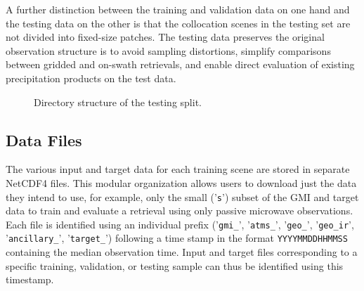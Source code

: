 \documentclass[11pt]{article}
\begin{document}
A further distinction between the training and validation data on one hand and
the testing data on the other is that the collocation scenes in the testing set
are not divided into fixed-size patches. The testing data preserves the original
observation structure is to avoid sampling distortions, simplify comparisons
between gridded and on-swath retrievals, and enable direct evaluation of
existing precipitation products on the test data.


\begin{figure}[hbpt!] %


	\caption{
		Directory structure of the testing split.
	}
	\label{fig:testing_organization}
\end{figure}

\subsection{Data Files}

The various input and target data for each training scene are stored in separate
NetCDF4 files. This modular organization allows users to download just the data
they intend to use, for example, only the small ('\texttt{s}') subset of the GMI
and target data to train and evaluate a retrieval using only passive microwave
observations. Each file is identified using an individual prefix
('\texttt{gmi\_}', '\texttt{atms\_}', '\texttt{geo\_}', '\texttt{geo\_ir}',
'\texttt{ancillary\_}', '\texttt{target\_}') following a time stamp in the format
\texttt{YYYYMMDDHHMMSS} containing the median observation time. Input and target
files corresponding to a specific training, validation, or testing sample can
thus be identified using this timestamp.
\end{document}

